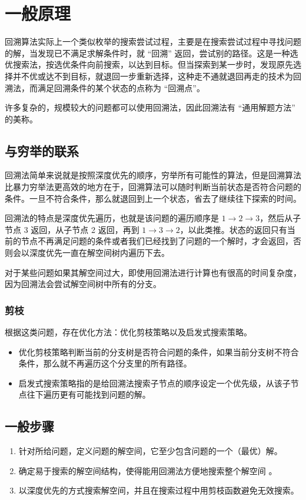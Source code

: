 \maketitle

\section{一般原理}
回溯算法实际上一个类似枚举的搜索尝试过程，主要是在搜索尝试过程中寻找问题的解，当发现已不满足求解条件时，就 ``回溯'' 返回，尝试别的路径。这是一种选优搜索法，按选优条件向前搜索，以达到目标。但当探索到某一步时，发现原先选择并不优或达不到目标，就退回一步重新选择，这种走不通就退回再走的技术为回溯法，而满足回溯条件的某个状态的点称为 ``回溯点''。

许多复杂的，规模较大的问题都可以使用回溯法，因此回溯法有 ``通用解题方法'' 的美称。

\subsection{与穷举的联系}
回溯法简单来说就是按照深度优先的顺序，穷举所有可能性的算法，但是回溯算法比暴力穷举法更高效的地方在于，回溯算法可以随时判断当前状态是否符合问题的条件。一旦不符合条件，那么就退回到上一个状态，省去了继续往下探索的时间。

回溯法的特点是深度优先遍历，也就是该问题的遍历顺序是 $1\to2\to3$，然后从子节点 3 返回，从子节点 2 返回，再到 $1\to3\to2$，以此类推。状态的返回只有当前的节点不再满足问题的条件或者我们已经找到了问题的一个解时，才会返回，否则会以深度优先一直在解空间树内遍历下去。

对于某些问题如果其解空间过大，即使用回溯法进行计算也有很高的时间复杂度，因为回溯法会尝试解空间树中所有的分支。

\subsubsection{剪枝}
根据这类问题，存在优化方法：优化剪枝策略以及启发式搜索策略。\begin{itemize}
    \item 优化剪枝策略判断当前的分支树是否符合问题的条件，如果当前分支树不符合条件，那么就不再遍历这个分支里的所有路径。

    \item 启发式搜索策略指的是给回溯法搜索子节点的顺序设定一个优先级，从该子节点往下遍历更有可能找到问题的解。
\end{itemize}

\subsection{一般步骤}
\begin{enumerate}
    \item 针对所给问题，定义问题的解空间，它至少包含问题的一个（最优）解。
    \item 确定易于搜索的解空间结构，使得能用回溯法方便地搜索整个解空间 。
    \item 以深度优先的方式搜索解空间，并且在搜索过程中用剪枝函数避免无效搜索。
\end{enumerate}

